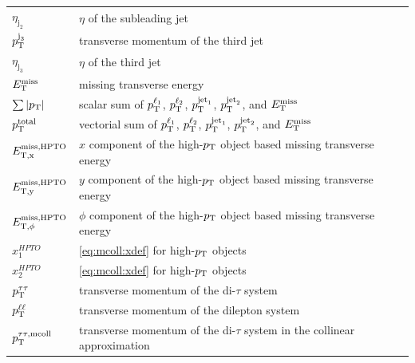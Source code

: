 \begin{table}[htpb]
\begin{tabular}{ll}
        $\eta_{\text{j}_2}$     & $\eta$ of the subleading jet \\
        $p_\text{T}^{\text{j}_3}$      & transverse momentum of the third jet \\
        $\eta_{\text{j}_3}$     & $\eta$ of the third jet \\
        $E_\text{T}^\text{miss}$               & missing transverse energy \\
        $\sum \left|p_\text{T}\right|$        & scalar sum of $p_\text{T}^{\ell_1}$, $p_\text{T}^{\ell_2}$, $p_\text{T}^{\text{jet}_1}$, $p_\text{T}^{\text{jet}_2}$, and $E_\text{T}^\text{miss}$ \\
        $p_\text{T}^\text{total}$      & vectorial sum of $p_\text{T}^{\ell_1}$, $p_\text{T}^{\ell_2}$, $p_\text{T}^{\text{jet}_1}$, $p_\text{T}^{\text{jet}_2}$, and $E_\text{T}^\text{miss}$\\
        $E_\text{T,x}^\text{miss,HPTO}$          & $x$ component of the high-$p_\text{T}$ object based missing transverse energy \\
        $E_\text{T,y}^\text{miss,HPTO}$          & $y$ component of the high-$p_\text{T}$ object based missing transverse energy \\
        $E_{\text{T},\phi}^\text{miss,HPTO}$        & $\phi$ component of the high-$p_\text{T}$ object based missing transverse energy \\
        $x_1^{HPTO}$            & \cref{eq:mcoll:xdef} for high-$p_\text{T}$ objects \\
        $x_2^{HPTO}$            & \cref{eq:mcoll:xdef} for high-$p_\text{T}$ objects \\
        $p_\text{T}^{\tau\tau}$        & transverse momentum of the di-$\tau$ system \\
        $p_\text{T}^{\ell\ell}$        & transverse momentum of the dilepton system \\
        $p_\text{T}^{\tau\tau,\text{mcoll}}$ & transverse momentum of the di-$\tau$ system in the collinear approximation \\
        \bottomrule
    \end{tabular}
\end{table}

